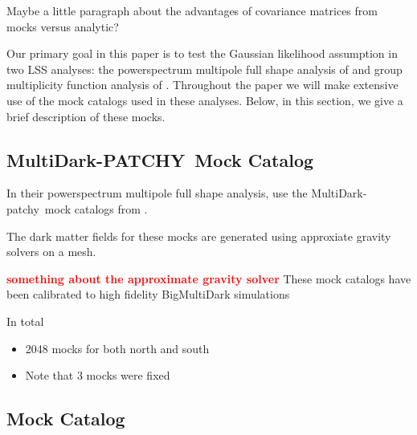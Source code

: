 \documentclass[12pt, letterpaper, preprint]{aastex}
\newcommand{\bitem}{\begin{itemize}}
\newcommand{\eitem}{\end{itemize}}
\newcommand{\todo}[1]{{\bf \textcolor{red}{#1}}}
\newcommand{\patchy}{{\fontshape\scdefault\selectfont patchy}}
\begin{document}
Maybe a little paragraph about the advantages of covariance matrices from 
mocks versus analytic? 

Our primary goal in this paper is to test the Gaussian likelihood assumption 
in two LSS analyses: the powerspectrum multipole full shape analysis of \cite{beutler2017} 
and group multiplicity function analysis of \cite{sinha2017}. Throughout
the paper we will make extensive use of the mock catalogs used in these 
analyses. Below, in this section, we give a brief description of these mocks. 

\subsection{MultiDark-PATCHY~Mock Catalog} 
In their powerspectrum multipole full shape analysis, \cite{beutler2017}
use the MultiDark-\patchy~mock catalogs from \cite{kitaura2016}. 


The dark matter fields for these mocks are generated using approxiate
gravity solvers on a mesh. 


\todo{something about the approximate gravity solver} 
These mock catalogs have been calibrated to high fidelity BigMultiDark 
simulations~\citep{rodriguez-torres2016, klypin2016}

In total \cite{beutler2017} 



\bitem
    \item 2048 mocks for both north and south 
    \item Note that 3 mocks were fixed
\eitem

\subsection{\cite{sinha2017} Mock Catalog}
\end{document}
